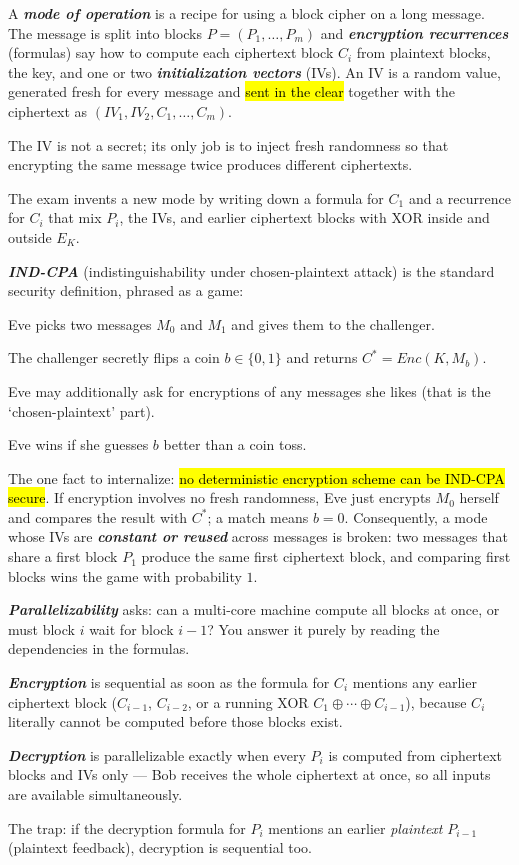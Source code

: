 \documentclass[12pt, a4paper]{article}
\newcommand{\term}[1]{\textbf{\textit{#1}}}        %
\newcommand{\imp}[1]{\hl{#1}}                       %
\begin{document}
A \term{mode of operation} is a recipe for using a block cipher on a long message. The message is split into blocks $P = (P_1, \dots, P_m)$ and \term{encryption recurrences} (formulas) say how to compute each ciphertext block $C_i$ from plaintext blocks, the key, and one or two \term{initialization vectors} (IVs).
An IV is a random value, generated fresh for every message and \imp{sent in the clear} together with the ciphertext as $(IV_1, IV_2, C_1, \dots, C_m)$.

The IV is not a secret; its only job is to inject fresh randomness so that encrypting the same message twice produces different ciphertexts.

The exam invents a new mode by writing down a formula for $C_1$ and a recurrence for $C_i$ that mix $P_i$, the IVs, and earlier ciphertext blocks with XOR inside and outside $E_K$.

\term{IND-CPA} (indistinguishability under chosen-plaintext attack) is the standard security definition, phrased as a game:
\begin{tightitem}
    \item Eve picks two messages $M_0$ and $M_1$ and gives them to the challenger.
    \item The challenger secretly flips a coin $b \in \{0, 1\}$ and returns $C^* = Enc(K, M_b)$.
    \item Eve may additionally ask for encryptions of any messages she likes (that is the `chosen-plaintext' part).
    \item Eve wins if she guesses $b$ better than a coin toss.
\end{tightitem}
The one fact to internalize: \imp{no deterministic encryption scheme can be IND-CPA secure}. If encryption involves no fresh randomness, Eve just encrypts $M_0$ herself and compares the result with $C^*$; a match means $b = 0$.
Consequently, a mode whose IVs are \term{constant or reused} across messages is broken: two messages that share a first block $P_1$ produce the same first ciphertext block, and comparing first blocks wins the game with probability $1$.

\term{Parallelizability} asks: can a multi-core machine compute all blocks at once, or must block $i$ wait for block $i - 1$? You answer it purely by reading the dependencies in the formulas.
\begin{tightitem}
    \item \term{Encryption} is sequential as soon as the formula for $C_i$ mentions any earlier ciphertext block ($C_{i-1}$, $C_{i-2}$, or a running XOR $C_1 \oplus \cdots \oplus C_{i-1}$), because $C_i$ literally cannot be computed before those blocks exist.
    \item \term{Decryption} is parallelizable exactly when every $P_i$ is computed from ciphertext blocks and IVs only --- Bob receives the whole ciphertext at once, so all inputs are available simultaneously.
    \item The trap: if the decryption formula for $P_i$ mentions an earlier \emph{plaintext} $P_{i-1}$ (plaintext feedback), decryption is sequential too.
\end{tightitem}
\end{document}
